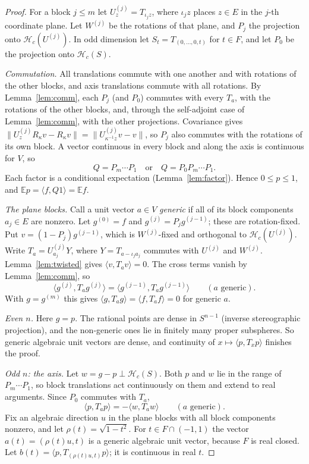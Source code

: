 \documentclass[11pt]{amsart}
\theoremstyle{definition}
\newcommand{\cH}{\mathcal{H}}
\newcommand{\E}{\mathbb{E}}
\begin{document}
\begin{proof}
For a block $j\le m$ let $U^{(j)}_z=T_{\iota_jz}$, where $\iota_jz$ places $z\in E$ in the $j$-th coordinate plane. Let $W^{(j)}$ be the rotations of that plane, and $P_j$ the projection onto $\cH_c(U^{(j)})$. In odd dimension let $S_t=T_{(0,\dots,0,t)}$ for $t\in F$, and let $P_0$ be the projection onto $\cH_c(S)$.

\emph{Commutation.} All translations commute with one another and with rotations of the other blocks, and axis translations commute with all rotations. By Lemma~\ref{lem:comm}, each $P_j$ (and $P_0$) commutes with every $T_a$, with the rotations of the other blocks, and, through the self-adjoint case of Lemma~\ref{lem:comm}, with the other projections. Covariance gives $\|U^{(j)}_zR_\kappa v-R_\kappa v\|=\|U^{(j)}_{\kappa^{-1}z}v-v\|$, so $P_j$ also commutes with the rotations of its own block. A vector continuous in every block and along the axis is continuous for $V$, so
\[
Q=P_m\cdots P_1\quad\text{or}\quad Q=P_0P_m\cdots P_1 .
\]
Each factor is a conditional expectation (Lemma~\ref{lem:factor}). Hence $0\le p\le1$, and $\E p=\langle f,Q1\rangle=\E f$.

\emph{The plane blocks.} Call a unit vector $a\in V$ \emph{generic} if all of its block components $a_j\in E$ are nonzero. Let $g^{(0)}=f$ and $g^{(j)}=P_jg^{(j-1)}$; these are rotation-fixed. Put $v=(1-P_j)g^{(j-1)}$, which is $W^{(j)}$-fixed and orthogonal to $\cH_c(U^{(j)})$. Write $T_a=U^{(j)}_{a_j}Y$, where $Y=T_{a-\iota_ja_j}$ commutes with $U^{(j)}$ and $W^{(j)}$. Lemma~\ref{lem:twisted} gives $\langle v,T_av\rangle=0$. The cross terms vanish by Lemma~\ref{lem:comm}, so
\[
\langle g^{(j)},T_ag^{(j)}\rangle=\langle g^{(j-1)},T_ag^{(j-1)}\rangle\qquad(a\text{ generic}).
\]
With $g=g^{(m)}$ this gives $\langle g,T_ag\rangle=\langle f,T_af\rangle=0$ for generic $a$.

\emph{Even $n$.} Here $g=p$. The rational points are dense in $S^{n-1}$ (inverse stereographic projection), and the non-generic ones lie in finitely many proper subspheres. So generic algebraic unit vectors are dense, and continuity of $x\mapsto\langle p,T_xp\rangle$ finishes the proof.

\emph{Odd $n$: the axis.} Let $w=g-p\perp\cH_c(S)$. Both $p$ and $w$ lie in the range of $P_m\cdots P_1$, so block translations act continuously on them and extend to real arguments. Since $P_0$ commutes with $T_a$,
\begin{equation}\label{eq:split}
\langle p,T_ap\rangle=-\langle w,T_aw\rangle\qquad(a\text{ generic}).
\end{equation}
Fix an algebraic direction $u$ in the plane blocks with all block components nonzero, and let $\rho(t)=\sqrt{1-t^2}$. For $t\in F\cap(-1,1)$ the vector $a(t)=(\rho(t)u,t)$ is a generic algebraic unit vector, because $F$ is real closed. Let $b(t)=\langle p,T_{(\rho(t)u,t)}p\rangle$; it is continuous in real $t$.


\end{proof}
\end{document}
